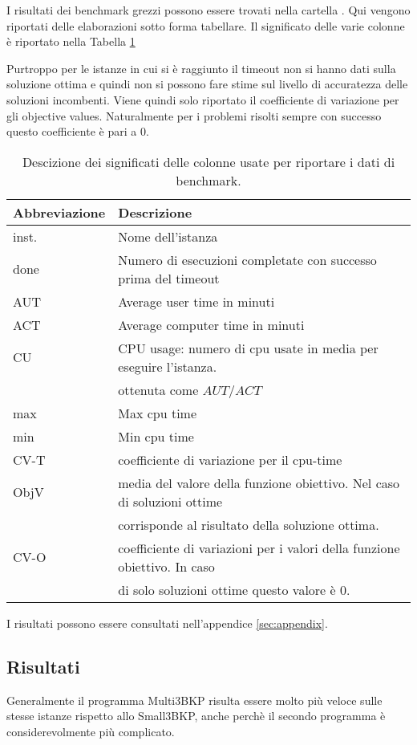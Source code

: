 I risultati dei benchmark grezzi possono essere trovati nella cartella 
. Qui vengono riportati delle elaborazioni sotto forma tabellare.
Il significato delle varie colonne è riportato nella Tabella \ref{table:description}

Purtroppo per le istanze in cui si è raggiunto il timeout non si hanno dati
sulla soluzione ottima e quindi non si possono 
fare stime sul livello di accuratezza delle soluzioni incombenti.
Viene quindi solo riportato il coefficiente di variazione per gli
objective values. Naturalmente 
per i problemi risolti sempre con successo questo coefficiente è pari a $0$.

\begin{table}
\centering
\small
\begin{tabular}{| l| l |}
\hline
Abbreviazione & Descrizione \\
\hline
inst. & Nome dell'istanza \\
done & Numero di esecuzioni completate con successo prima del timeout\\
AUT & Average user time in minuti \\
ACT & Average computer time in minuti\\
CU  & CPU usage: numero di cpu usate in media per eseguire l'istanza. \\
	& ottenuta come $AUT/ACT$\\
max & Max cpu time \\
min & Min cpu time \\
CV-T & coefficiente di variazione per il cpu-time \\
ObjV & media del valore della funzione obiettivo. Nel caso di soluzioni ottime \\
	& corrisponde al risultato della soluzione ottima.\\
CV-O & coefficiente di variazioni per i valori della funzione obiettivo. In caso \\
& di solo soluzioni ottime questo valore è $0$. \\
\hline
\end{tabular}
\caption{Descizione dei significati delle colonne usate per riportare i dati
di benchmark.}
\label{table:description}
\end{table}
I risultati possono essere consultati nell'appendice \ref{sec:appendix}.

\subsection{Risultati}
Generalmente il programma Multi3BKP risulta essere molto più veloce sulle 
stesse istanze rispetto allo Small3BKP, anche perchè il secondo programma 
è considerevolmente più complicato. 

